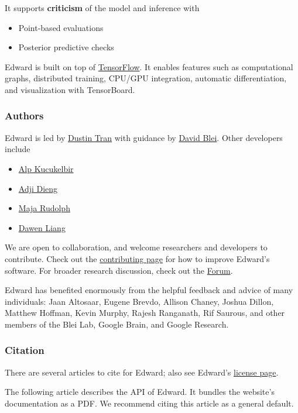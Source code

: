 It supports \textbf{criticism} of the model and inference with

\begin{itemize}
\item Point-based evaluations
\item Posterior predictive checks
\end{itemize}

Edward is built on top of
\href{https://www.tensorflow.org}{TensorFlow}. It enables features such
as computational graphs, distributed training, CPU/GPU integration,
automatic differentiation, and visualization with TensorBoard.

\subsubsection{Authors}

Edward is led by \href{http://dustintran.com}{Dustin Tran} with guidance
by \href{http://www.cs.columbia.edu/~blei/}{David Blei}. Other developers
include
\begin{itemize}
  \item \href{http://www.proditus.com/}{Alp Kucukelbir}
  \item \href{http://stat.columbia.edu/~diengadji/}{Adji Dieng}
  \item \href{http://maja-rita-rudolph.com/}{Maja Rudolph}
  \item \href{http://www.ee.columbia.edu/~dliang/}{Dawen Liang}
\end{itemize}
We are open to collaboration, and welcome
researchers and developers to contribute. Check out the
\href{/contributing}{contributing page} for how to improve Edward's software.
For broader research discussion, check out the
\href{http://discuss.edwardlib.org}{Forum}.

Edward has benefited enormously from the helpful feedback and advice
of many individuals: Jaan Altosaar, Eugene Brevdo, Allison Chaney,
Joshua Dillon, Matthew Hoffman, Kevin Murphy, Rajesh Ranganath, Rif
Saurous, and other members of the Blei Lab, Google Brain, and Google
Research.

\subsubsection{Citation}

There are several articles to cite for Edward;
also see Edward's \href{/license}{license page}.

The following article describes the API of Edward. It bundles the
website's documentation as a PDF.
We recommend citing this article as a general default.

